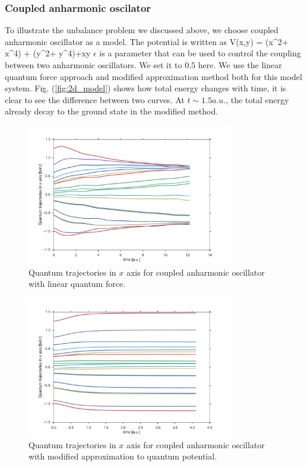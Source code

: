 \documentclass[11pt,letter,nocenter]{revtex4-1}
\begin{document}
\subsubsection{Coupled anharmonic oscilator}
To illustrate the unbalance problem we discussed above, we choose coupled anharmonic oscillator as a model.  
The potential is written as 
\be V(x,y) =  (x^2+ x^4) +  (y^2+ y^4)+\epsilon xy  \ee 
$\epsilon$ is a parameter that can be used to control the coupling between two anharmonic oscillators. 
We set it to $0.5$ here. 
We use the linear quantum force approach and modified approximation method both for this model system. 
Fig. (\ref{fig:2d_model}) shows how total energy changes with time, it is clear to see the difference between two curves. At $t \sim 1.5 a.u.$, the total energy already decay to the ground state in the modified method.   

\begin{figure}[htbp]
\includegraphics[width=0.8\textwidth]{figs/traj_lqf.pdf}
\caption{Quantum trajectories in $x$ axis for coupled anharmonic oscillator with linear quantum force.}
\label{fig:traj_lqf}
\end{figure}


\begin{figure}[htbp]
\includegraphics[width=0.8\textwidth]{figs/traj_fix.pdf}
\caption{Quantum trajectories in $x$ axis for coupled anharmonic oscillator with modified approximation to quantum potential.}
\label{fig:traj_fix}
\end{figure}
 
\end{document}
